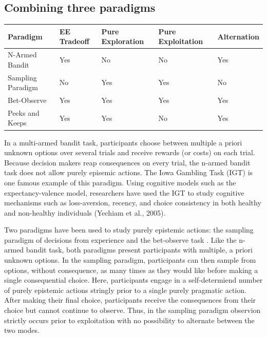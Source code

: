 \documentclass[a4paper,doc,natbib,floatsintext]{apa6}\usepackage[]{graphicx}\usepackage[]{color}
\begin{document}
\subsection{Combining three paradigms}


\begin{center}
    \begin{tabular}{ | l | l | l | l | l |}
    \hline
    Paradigm & EE Tradeoff & Pure Exploration & Pure Exploitation & Alternation \\ \hline
    N-Armed Bandit & Yes & No & No & Yes\\ \hline
    Sampling Paradigm & No & Yes & Yes & No\\ \hline
    Bet-Observe & Yes & Yes & Yes & Yes\\ \hline
    Peeks and Keeps & Yes & Yes & No & Yes\\ \hline
    \hline
    \end{tabular}
\end{center}


In a multi-armed bandit task, participants choose between multiple a priori unknown options over several trials and receive rewards (or costs) on each trial. Because decision makers reap consequences on every trial, the n-armed bandit task does not allow purely episemic actions. The Iowa Gambling Task (IGT) is one famous example of this paradigm. Using cognitive models such as the expectancy-valence model, researchers have used the IGT to study cognitive mechanisms such as loss-aversion, recency, and choice consistency in both healthy and non-healthy individuals (Yechiam et al., 2005).

Two paradigms have been used to study purely epistemic actions: the sampling paradigm of decisions from experience \citep{hertwig2004decisions} and the bet-observe task \citep{tversky1966information}. Like the n-armed bandit task, both paradigms present participants with multiple, a priori unknown options. In the sampling paradigm, participants can then sample from options, without consequence, as many times as they would like before making a single consequential choice. Here, participants engage in a self-determiend number of purely epistemic actions stringly prior to a single purely pragmatic action. After making their final choice, participants receive the consequences from their choice but cannot continue to observe. Thus, in the sampling paradigm observion strictly occurs prior to exploitation with no possibility to alternate between the two modes.
\end{document}
